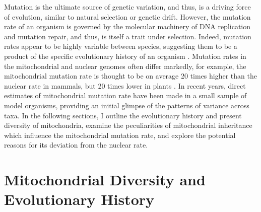 \documentclass[12pt,twoside]{reedthesis}
\begin{document}
\onehalfspacing


Mutation is the ultimate source of genetic variation, and thus, is a driving force of evolution, similar to natural selection or genetic drift. 
However, the mutation rate of an organism is governed by the molecular machinery of DNA replication and mutation repair, and thus, is itself a trait under selection.
Indeed, mutation rates appear to be highly variable between species, suggesting them to be a product of the specific evolutionary history of an organism \citep{lynch_evolution_2010}.
Mutation rates in the mitochondrial and nuclear genomes often differ markedly, for example, the mitochondrial mutation rate is thought to be on average 20 times higher than the nuclear rate in mammals, but 20 times lower in plants \citep{lynch_mutation_2006}.
In recent years, direct estimates of mitochondrial mutation rate have been made in a small sample of model organisms, providing an initial glimpse of the patterns of variance across taxa.
In the following sections, I outline the evolutionary history and present diversity of mitochondria, examine the peculiarities of mitochondrial inheritance which influence the mitochondrial mutation rate, and explore the potential reasons for its deviation from the nuclear rate.

\section{Mitochondrial Diversity and Evolutionary History}	
\end{document}

